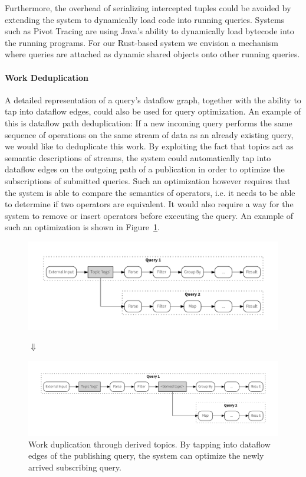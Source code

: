 Furthermore, the overhead of serializing intercepted tuples could be avoided
by extending the system to dynamically load code into running queries. Systems
such as Pivot Tracing are using Java's ability to dynamically load
bytecode into the running programs. For our Rust-based system we envision a
mechanism where queries are attached as dynamic shared objects onto other
running queries.

\paragraph{Work Deduplication}

A detailed representation of a query's dataflow graph, together with the ability
to tap into dataflow edges, could also be used for query optimization. An example
of this is dataflow path deduplication: If a new incoming query performs the same
sequence of operations on the same stream of data as an already existing
query, we would like to deduplicate this work. By exploiting the fact that
topics act as semantic descriptions of streams, the system could automatically
tap into dataflow edges on the outgoing path of a publication in order to
optimize the subscriptions of submitted queries. Such an optimization however
requires that the system is able to compare the semantics of operators,
i.e. it needs to be able to determine if two operators are equivalent. It
would also require a way for the system to remove or insert operators before
executing the query.
An example of such an optimization is shown in Figure~\ref{fig:queryoptimization}.

\begin{figure}[!htb]
  \includegraphics[scale=0.36]{figures/composition/q1q2_man}
  \vspace{-1.5em}
  \begin{center}
  $\Downarrow$
  \end{center}
  \vspace{-1.2em}
  \includegraphics[scale=0.36]{figures/composition/q1q2_auto}
  \caption[Work duplication through derived topics]{
  Work duplication through derived topics. By tapping into dataflow edges
  of the publishing query, the system can optimize the newly arrived
  subscribing query.}
  \label{fig:queryoptimization}
\end{figure}




